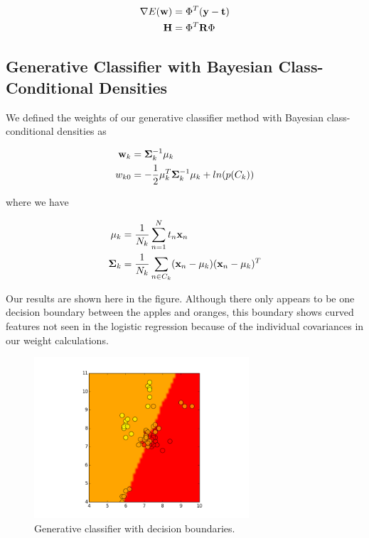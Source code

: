 \documentclass[11pt]{amsart}
\begin{document}
\begin{align*}
\nabla E(\bold{w}) &= \Phi ^ T (\bold{y} - \bold{t}) \\
\bold{H} &= \Phi ^T \bold{R} \Phi \\
\end{align*}

\subsection{Generative Classifier with Bayesian Class-Conditional Densities}

We defined the weights of our generative classifier method with Bayesian class-conditional densities as

\begin{align*}
\bold{w}_k &= \bold{\Sigma}_k ^{-1} \bold{\mu}_k \\
w_{k0} &= -\frac{1}{2}  \bold{\mu}_k ^ T \bold{\Sigma}_k ^{-1} \bold{\mu}_k + ln(p(C_k)) \\
\end{align*}

where we have

\begin{align*}
\bold{\mu}_k &= \frac{1}{N_k} \sum_{n = 1}^{N} t_n \bold{x}_n \\
\bold{\Sigma}_k &= \frac{1}{N_k} \sum_{n \in C_k} (\bold{x}_n - \mu_k)(\bold{x}_n - \mu_k) ^T \\
\end{align*}

Our results are shown here in the figure. Although there only appears to be one decision boundary between the apples and oranges, this boundary shows curved features not seen in the logistic regression because of the individual covariances in our weight calculations. 

\begin{figure}
  \includegraphics[width=8cm]{figure_4.png}
  \caption{Generative classifier with decision boundaries.}
\end{figure}
\end{document}

